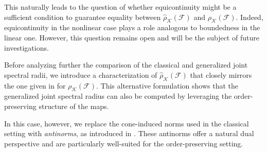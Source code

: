 \documentclass{article}
\newcommand{\family}{\mathcal{F}}
\newcommand{\cradius}{\rho_{\cone}}
\newcommand{\cgradius}{\widehat{\rho}_{\cone}}
\newcommand{\cone}{\mathcal{K}}
\begin{document}
This naturally leads to the question of whether {equicontinuity} might be a sufficient condition to guarantee equality between $\cgradius(\family)$ and $\cradius(\family)$. Indeed, equicontinuity in the nonlinear case plays a role analogous to boundedness in the linear one. However, this question remains open and will be the subject of future investigations.


Before analyzing further the comparison of the classical and generalized joint spectral radii, we introduce a characterization of $\cgradius(\family)$ that closely mirrors the one given in  for $\cradius(\family)$. This alternative formulation shows that the generalized joint spectral radius can also be computed by leveraging the order-preserving structure of the maps.

In this case, however, we replace the cone-induced norms used in the classical setting with \emph{antinorms}, as introduced in \cite{MERIKOSKI1991315}. These antinorms offer a natural dual perspective and are particularly well-suited for the order-preserving setting.
\end{document}
